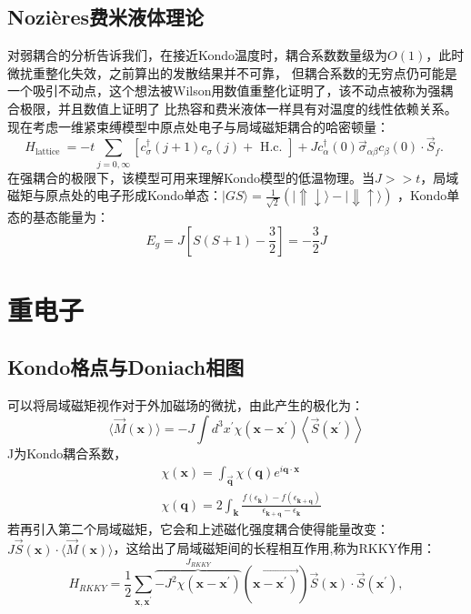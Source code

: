 \documentclass[10pt,openany]{book}
\theoremstyle{thmstyle} %
\theoremstyle{defstyle} %
\theoremstyle{prostyle} %
\begin{document}
\subsection*{Nozières费米液体理论}
对弱耦合的分析告诉我们，在接近Kondo温度时，耦合系数数量级为$ O(1) $，此时微扰重整化失效，之前算出的发散结果并不可靠，
但耦合系数的无穷点仍可能是一个吸引不动点，这个想法被Wilson用数值重整化证明了，该不动点被称为强耦合极限，并且数值上证明了
比热容和费米液体一样具有对温度的线性依赖关系。现在考虑一维紧束缚模型中原点处电子与局域磁矩耦合的哈密顿量：
\begin{equation}
	H_{\text {lattice }}=-t \sum_{j=0, \infty}\left[c_\sigma^{\dagger}(j+1) c_\sigma(j)+\text { H.c. }\right]+J c_\alpha^{\dagger}(0) \vec{\sigma}_{\alpha \beta} c_\beta(0) \cdot \vec{S}_f \text {. }
\end{equation}
在强耦合的极限下，该模型可用来理解Kondo模型的低温物理。当$ J>>t $，局域磁矩与原点处的电子形成Kondo单态：$ |G S\rangle=\frac{1}{\sqrt{2}}(|\Uparrow \downarrow\rangle-|\Downarrow \uparrow\rangle) $
，Kondo单态的基态能量为：
\begin{equation}
	E_g=J\left[S(S+1)-\frac{3}{2}\right]=-\frac{3}{2} J
\end{equation}  
\section{重电子}
\subsection{Kondo格点与Doniach相图}
可以将局域磁矩视作对于外加磁场的微扰，由此产生的极化为：
\begin{equation}
	\langle\vec{M}(\mathbf{x})\rangle=-J \int d^3 x^{\prime} \chi\left(\mathbf{x}-\mathbf{x}^{\prime}\right)\left\langle\vec{S}\left(\mathbf{x}^{\prime}\right)\right\rangle
\end{equation}
J为Kondo耦合系数，
\begin{equation}
	\begin{aligned}
		& \chi(\mathbf{x})=\int_{\overrightarrow{\mathbf{q}}} \chi(\mathbf{q}) e^{i \mathbf{q} \cdot \mathbf{x}} \\
		& \chi(\mathbf{q})=2 \int_{\mathbf{k}} \frac{f\left(\epsilon_{\mathbf{k}}\right)-f\left(\epsilon_{\mathbf{k}+\mathbf{q}}\right)}{\epsilon_{\mathbf{k}+\mathbf{q}}-\epsilon_{\mathbf{k}}}
		\end{aligned}
\end{equation}
若再引入第二个局域磁矩，它会和上述磁化强度耦合使得能量改变：$ J \vec{S}(\mathbf{x}) \cdot\langle\vec{M}(\mathbf{x})\rangle $，这给出了局域磁矩间的长程相互作用,称为RKKY作用：
\begin{equation}
	H_{R K K Y}=\frac{1}{2} \sum_{\mathbf{x}, \mathbf{x}^{\prime}} \overbrace{-J^2 \chi\left(\mathbf{x}-\mathbf{x}^{\prime}\right)}^{J_{R K K Y}}\left(\overrightarrow{\left.\mathbf{x}-\mathbf{x}^{\prime}\right)}\right) \vec{S}(\mathbf{x}) \cdot \vec{S}\left(\mathbf{x}^{\prime}\right),
\end{equation} 
\\
\end{document}
